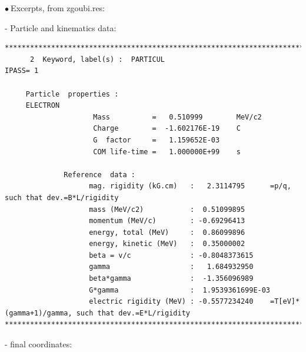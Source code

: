 \documentclass[10pt]{article}
\newcommand{\nib}{\noindent \ensuremath{\bullet~}}
\begin{document}
\nib Excerpts, from zgoubi.res:


- Particle and kinematics data:

{\tiny
\begin{verbatim}
*******************************************************************************************************************************
      2  Keyword, label(s) :  PARTICUL                                                                                 IPASS= 1

     Particle  properties :
     ELECTRON
                     Mass          =   0.510999        MeV/c2
                     Charge        =  -1.602176E-19    C     
                     G  factor     =   1.159652E-03          
                     COM life-time =   1.000000E+99    s     

              Reference  data :
                    mag. rigidity (kG.cm)   :   2.3114795      =p/q, such that dev.=B*L/rigidity
                    mass (MeV/c2)           :  0.51099895    
                    momentum (MeV/c)        : -0.69296413    
                    energy, total (MeV)     :  0.86099896    
                    energy, kinetic (MeV)   :  0.35000002    
                    beta = v/c              : -0.8048373615    
                    gamma                   :   1.684932950    
                    beta*gamma              :  -1.356096989    
                    G*gamma                 :  1.9539361699E-03
                    electric rigidity (MeV) : -0.5577234240    =T[eV]*(gamma+1)/gamma, such that dev.=E*L/rigidity
*******************************************************************************************************************************
\end{verbatim}
}

- final coordinates:
\end{document}
